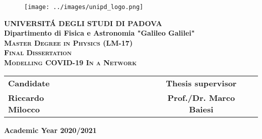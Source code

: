 \documentclass[a4paper,12pt,twoside]{book} %
\makeatletter
\theoremstyle{definition}
\renewcommand\tableofcontents{%
    \section*{\Huge{\contentsname}}%
    \@starttoc{toc}%
}
\makeatother
\begin{document}

\begin{titlepage}
\vspace{5mm}
\begin{figure}[hbtp]
\centering
\texttt{[image: ../images/unipd\_logo.png]}
\end{figure}
\vspace{5mm}
\begin{center}
{{\huge{\textbf{\LARGE UNIVERSIT\'A DEGLI STUDI DI PADOVA}}}\\}
\vspace{20mm}
{\Large{\bf Dipartimento di Fisica e Astronomia "Galileo Galilei"}} \\
\vspace{5mm}
{\Large{\textsc{\bf Master Degree in Physics (LM-17)}}}\\  
\vspace{20mm}
{\Large{\textsc{\bf Final Dissertation}}}\\
\vspace{30mm}
{\Large{\textsc{\bf Modelling COVID-19 In a Network}}}\\
\vspace{45mm}
\end{center}

\begin{spacing}{2}
\begin{tabular}{lccccccccccl}
	{\Large{\bf Candidate}} &&&&&&&&&& {\Large{\bf Thesis supervisor}}\\
	{\Large{\bf Riccardo Milocco}} &&&&&&&&&& {\Large{\bf Prof./Dr. Marco Baiesi}}\\
\end{tabular}
\end{spacing}
\vspace{15 mm}

\begin{center}
{\Large{\bf Academic Year 2020/2021}}
\end{center}
\end{titlepage}

\restoregeometry

\clearpage{\pagestyle{empty}\cleardoublepage}

\pagestyle{empty}

\vspace*{\fill}
\tableofcontents
\vspace*{\fill}
\end{document}
